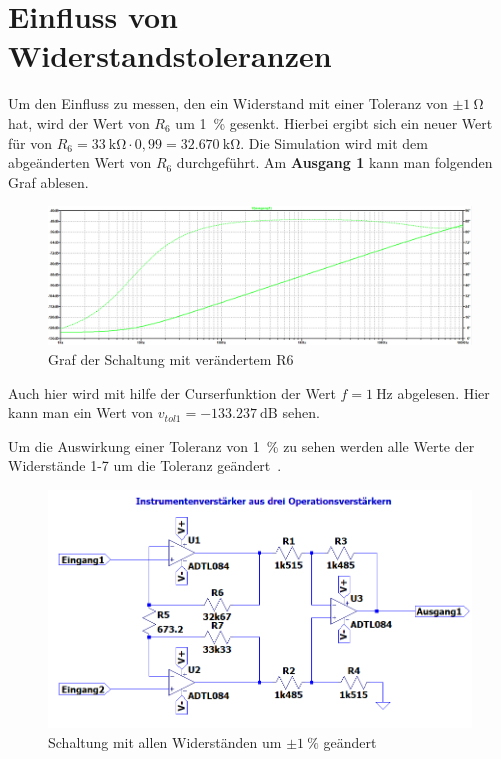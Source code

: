     \section{Einfluss von Widerstandstoleranzen}
        Um den Einfluss zu messen, den ein Widerstand mit einer Toleranz von \(\pm \SI{1}{\ohm}\) hat, wird der Wert von \(R_6\) um \SI{1}{\percent} gesenkt.
        Hierbei ergibt sich ein neuer Wert für von \(R_6= \SI{33}{\kilo\ohm}\cdot 0,99 = \SI{32,670}{\kilo\ohm}\). Die Simulation wird mit dem abgeänderten Wert von \(R_6\) durchgeführt. Am \textbf{Ausgang 1} kann man folgenden Graf ablesen.
        \begin{figure}[ht!]
            \centering
            \includegraphics[width=\linewidth]{widerstandr6.PNG}
            \caption{Graf der Schaltung mit verändertem R6}
        \end{figure}
        Auch hier wird mit hilfe der Curserfunktion der Wert \(f=\SI{1}{\Hz}\) abgelesen. Hier kann man ein Wert von \(v_{tol1} = -\SI{133,237}{\dB}\) sehen. \par
        Um die Auswirkung einer Toleranz von \SI{1}{\percent} zu sehen werden alle Werte der Widerstände 1-7 um die Toleranz geändert~. 
        \begin{figure}
            \centering
            \includegraphics[width=\linewidth]{maxtoleranz.PNG}
            \caption{Schaltung mit allen Widerständen um \(\pm\SI{1}{\percent}\) geändert}
            \label{toleranzschaltung}
        \end{figure}
